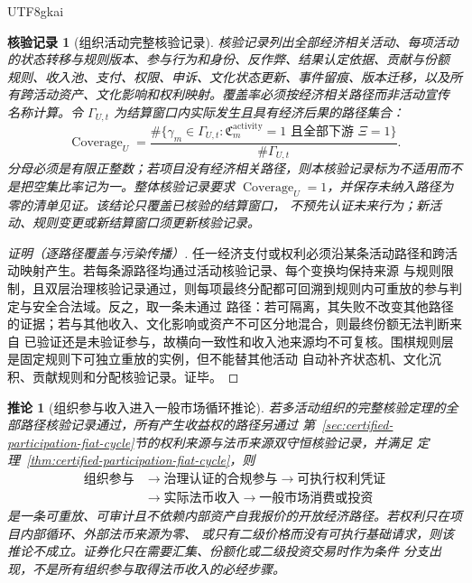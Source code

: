 \documentclass[12pt,a4paper,openany]{report}
\newtheorem{corollary}{推论}[chapter]
\newtheorem{Certificate}{核验记录}[chapter]
\begin{document}
\begin{CJK*}{UTF8}{gkai}
\begin{Certificate}[组织活动完整核验记录]
核验记录列出全部经济相关活动、每项活动的状态转移与规则版本、参与行为和身份、反作弊、结果认定依据、贡献与份额
规则、收入池、支付、权限、申诉、文化状态更新、事件留痕、版本迁移，以及所有跨活动资产、文化影响和权利映射。覆盖率必须按经济相关路径而非活动宣传
名称计算。令 \(\Gamma_{U,t}\) 为结算窗口内实际发生且具有经济后果的路径集合：
\[
  \operatorname{Coverage}_U
  =\frac{\#\{\gamma_m\in\Gamma_{U,t}:\mathfrak C_m^{\mathrm{activity}}=1
  \text{ 且全部下游 }\Xi=1\}}
  {\#\Gamma_{U,t}}.
\]
分母必须是有限正整数；若项目没有经济相关路径，则本核验记录标为不适用而不是把空集比率记为一。整体核验记录要求
\(\operatorname{Coverage}_U=1\)，并保存未纳入路径为零的清单见证。该结论只覆盖已核验的结算窗口，
不预先认证未来行为；新活动、规则变更或新结算窗口须更新核验记录。
\end{Certificate}

\begin{proof}[证明（逐路径覆盖与污染传播）]
任一经济支付或权利必须沿某条活动路径和跨活动映射产生。若每条源路径均通过活动核验记录、每个变换均保持来源
与规则限制，且双层治理核验记录通过，则每项最终分配都可回溯到规则内可重放的参与判定与安全合法域。反之，取一条未通过
路径：若可隔离，其失败不改变其他路径的证据；若与其他收入、文化影响或资产不可区分地混合，则最终份额无法判断来自
已验证还是未验证参与，故横向一致性和收入池来源均不可复核。围棋规则层是固定规则下可独立重放的实例，但不能替其他活动
自动补齐状态机、文化沉积、贡献规则和分配核验记录。证毕。
\end{proof}

\begin{corollary}[组织参与收入进入一般市场循环推论]
\label{cor:activity-payment-cycle}
若多活动组织的完整核验定理的全部路径核验记录通过，所有产生收益权的路径另通过
第~\ref{sec:certified-participation-fiat-cycle}节的权利来源与法币来源双守恒核验记录，并满足
定理~\ref{thm:certified-participation-fiat-cycle}，则
\[
\begin{aligned}
  \text{组织参与}
  &\longrightarrow
  \text{治理认证的合规参与}
  \longrightarrow
  \text{可执行权利凭证}\\
  &\longrightarrow
  \text{实际法币收入}
  \longrightarrow
  \text{一般市场消费或投资}
\end{aligned}
\]
是一条可重放、可审计且不依赖内部资产自我报价的开放经济路径。若权利只在项目内部循环、外部法币来源为零、
或只有二级价格而没有可执行基础请求，则该推论不成立。证券化只在需要汇集、份额化或二级投资交易时作为条件
分支出现，不是所有组织参与取得法币收入的必经步骤。
\end{corollary}


\end{CJK*}
\end{document}
